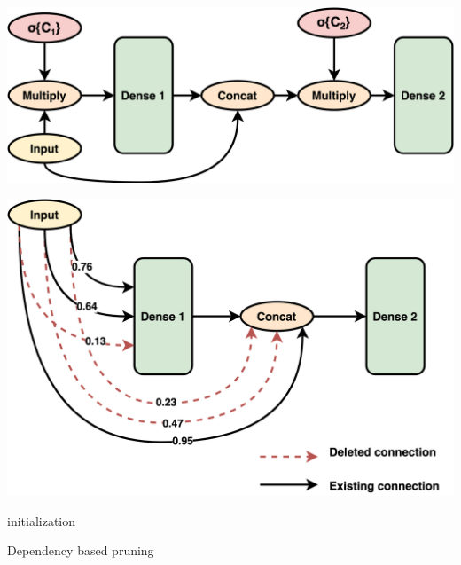 \documentclass{article}
\begin{document}
\noindent\begin{minipage}{.5\textwidth}
   \centering
   \includegraphics[scale=0.1]{paper/Pruning1.png}
\end{minipage}
\begin{minipage}{.4\textwidth}
\centering
   \includegraphics[scale=0.09]{paper/Pruning2.png}
\end{minipage}



\noindent\begin{minipage}{.5\textwidth}
  \begin{algorithm}[H]
\SetAlgoLined
{}
 initialization\;
 \caption{Dependency based pruning}
\end{algorithm}

\end{minipage}
\begin{minipage}{.4\textwidth}
\lipsum[6]
\end{minipage}
\end{document}

